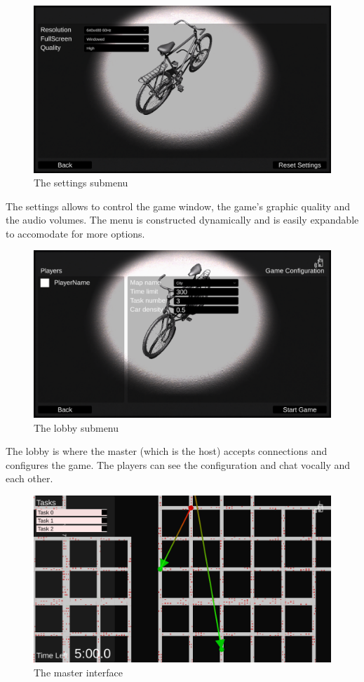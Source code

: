 \documentclass[12pt]{article}
\begin{document}
\begin{figure}[H]
\includegraphics[width=\textwidth]{settings}
\caption{The settings submenu}
\end{figure}
The settings allows to control the game window, the game's graphic quality and the audio volumes. The menu is constructed dynamically and is easily expandable to accomodate for more options.
\begin{figure}[H]
\includegraphics[width=\textwidth]{lobby}
\caption{The lobby submenu}
\end{figure}
The lobby is where the master (which is the host) accepts connections and configures the game. The players can see the configuration and chat vocally and each other. 
\begin{figure}[H]
\includegraphics[width=\textwidth]{master}
\caption{The master interface}
\end{figure}
\end{document}
